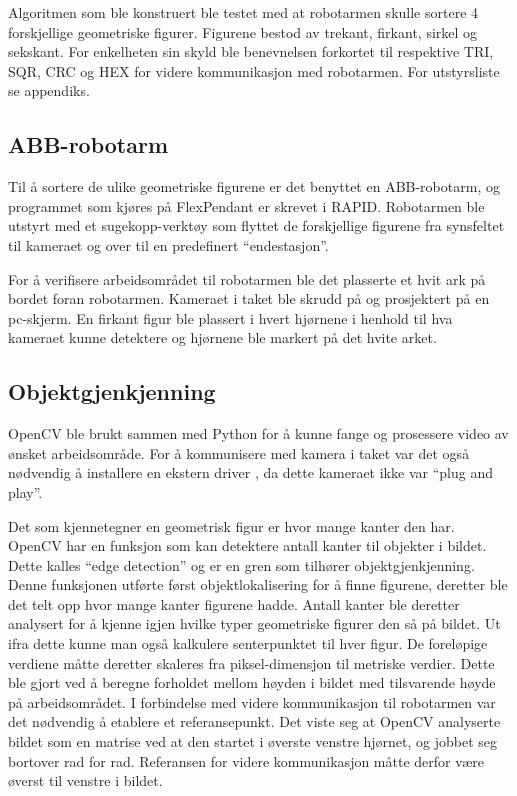 \documentclass[conference]{IEEEtran}
\begin{document}
    Algoritmen som ble konstruert ble testet med at robotarmen skulle sortere 4 forskjellige geometriske figurer. Figurene bestod av trekant, 
    firkant, sirkel og sekskant. For enkelheten sin skyld ble benevnelsen forkortet til respektive TRI, SQR, CRC og HEX for videre kommunikasjon 
    med robotarmen. 
    For utstyrsliste se appendiks. 
    
    \subsection{ABB-robotarm}
        Til å sortere de ulike geometriske figurene er det benyttet en ABB-robotarm, og programmet som kjøres på FlexPendant er skrevet i RAPID. 
        Robotarmen ble utstyrt med et sugekopp-verktøy som flyttet de forskjellige figurene fra synsfeltet til kameraet og over til en predefinert 
        “endestasjon”. 

        For å verifisere arbeidsområdet til robotarmen ble det plasserte et hvit ark på bordet foran robotarmen. Kameraet i taket ble skrudd på og 
        prosjektert på en pc-skjerm. En firkant figur ble plassert i hvert hjørnene i henhold til hva kameraet kunne detektere og hjørnene ble markert 
        på det hvite arket.

    \subsection{Objektgjenkjenning}
        OpenCV ble brukt sammen med Python for å kunne fange og prosessere video av ønsket arbeidsområde. For å kommunisere med kamera i taket 
        var det også nødvendig å installere en ekstern driver \cite{metode:kamera}, da dette kameraet ikke var “plug and play”.

        Det som kjennetegner en geometrisk figur er hvor mange kanter den har. OpenCV har en funksjon som kan detektere antall kanter til objekter 
        i bildet. Dette kalles “edge detection” og er en gren som tilhører objektgjenkjenning. Denne funksjonen utførte først objektlokalisering 
        for å finne figurene, deretter ble det telt opp hvor mange kanter figurene hadde. Antall kanter ble deretter analysert for å kjenne igjen 
        hvilke typer geometriske figurer den så på bildet. Ut ifra dette kunne man også kalkulere senterpunktet til hver figur. De foreløpige verdiene 
        måtte deretter skaleres fra piksel-dimensjon til metriske verdier. Dette ble gjort ved å beregne forholdet mellom høyden i bildet med tilsvarende 
        høyde på arbeidsområdet. I forbindelse med videre kommunikasjon til robotarmen var det nødvendig å etablere et referansepunkt.  Det viste seg at 
        OpenCV analyserte bildet som en matrise ved at den startet i øverste venstre hjørnet, og jobbet seg bortover rad for rad. Referansen for videre 
        kommunikasjon måtte derfor være øverst til venstre i bildet.
\end{document}
